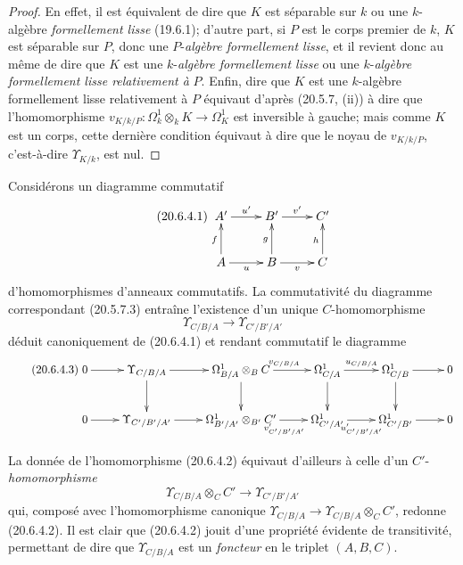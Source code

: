 \begin{proof}
En effet, il est équivalent de dire que $K$ est séparable sur $k$ ou une
$k$-algèbre \emph{formellement lisse} (19.6.1); d'autre part, si $P$ est le
corps premier de $k$, $K$ est séparable sur $P$, donc une $P$-\emph{algèbre
formellement lisse}, et il revient donc au même de dire que $K$ est une
$k$-\emph{algèbre formellement lisse} ou une $k$-\emph{algèbre formellement lisse
relativement à} $P$. Enfin, dire que $K$ est une $k$-algèbre formellement
lisse relativement à $P$ équivaut d'après (20.5.7, (ii)) à dire que
l'homomorphisme
$v_{K/k/P}:\Omega^1_k\otimes_k K\to\Omega^1_K$ est inversible à gauche;
mais comme $K$ est un corps, cette dernière condition équivaut à dire
que le noyau de $v_{K/k/P}$, c'est-à-dire $\Upsilon_{K/k}$, est nul.
\end{proof}

\begin{env}[20.6.4]
\label{0.20.6.4-fr}
Considérons un diagramme commutatif
\begin{equation}
\tag{20.6.4.1}
\label{0.20.6.4.1-fr}
\xymatrix{
  A' \ar[r]^{u'} & B' \ar[r]^{v'} & C' \\
  A \ar[u]^f \ar[r]_u & B \ar[u]^g \ar[r]_v & C \ar[u]^h
}
\end{equation}
d'homomorphismes d'anneaux commutatifs. La commutativité du diagramme
correspondant (20.5.7.3) entraîne l'existence d'un unique
$C$-homomorphisme
\begin{equation}
\tag{20.6.4.2}
\label{0.20.6.4.2-fr}
  \Upsilon_{C/B/A}\longrightarrow\Upsilon_{C'/B'/A'}
\end{equation}
déduit canoniquement de (20.6.4.1) et rendant commutatif le diagramme
\begin{equation}
\tag{20.6.4.3}
\label{0.20.6.4.3-fr}
\xymatrix{
  0 \ar[r] & \Upsilon_{C/B/A} \ar[r] \ar[d] &
  \Omega^1_{B/A}\otimes_B C \ar[r]^{v_{C/B/A}} \ar[d] &
  \Omega^1_{C/A} \ar[r]^{u_{C/B/A}} \ar[d] &
  \Omega^1_{C/B} \ar[r] \ar[d] & 0 \\
  0 \ar[r] & \Upsilon_{C'/B'/A'} \ar[r] &
  \Omega^1_{B'/A'}\otimes_{B'} C' \ar[r]_{v'_{C'/B'/A'}} &
  \Omega^1_{C'/A'} \ar[r]_{u'_{C'/B'/A'}} &
  \Omega^1_{C'/B'} \ar[r] & 0
}
\end{equation}

La donnée de l'homomorphisme (20.6.4.2) équivaut d'ailleurs à celle d'un
$C'$-\emph{homomorphisme}
\begin{equation}
\tag{20.6.4.4}
\label{0.20.6.4.4-fr}
  \Upsilon_{C/B/A}\otimes_C C'\longrightarrow\Upsilon_{C'/B'/A'}
\end{equation}
qui, composé avec l'homomorphisme canonique
$\Upsilon_{C/B/A}\to\Upsilon_{C/B/A}\otimes_C C'$, redonne (20.6.4.2).
Il est clair que (20.6.4.2) jouit d'une propriété évidente de
transitivité, permettant de dire que $\Upsilon_{C/B/A}$ est un
\emph{foncteur} en le triplet $(A,B,C)$.
\end{env}

